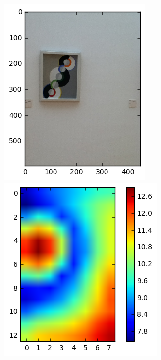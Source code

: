 \begin{figure}
  \begin{minipage}[c]{.33\linewidth}
    \includegraphics[width=\linewidth]{figures/sample3_30P-0976.png}
  \end{minipage} \hfill
  \begin{minipage}[c]{.33\linewidth}
    \includegraphics[width=\linewidth]{figures/sample3_heatmap.png}

\end{minipage}
\end{figure}
